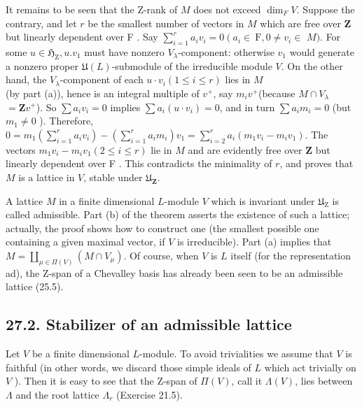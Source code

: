 \documentclass[10pt]{article}
\begin{document}
It remains to be seen that the Z-rank of $M$ does not exceed $\operatorname{dim}_{F} V$. Suppose the contrary, and let $r$ be the smallest number of vectors in $M$ which are free over $\mathbf{Z}$ but linearly dependent over F . Say $\sum_{i=1}^{r} a_{i} v_{i}=0\left(a_{i} \in \mathrm{~F}, 0 \neq v_{i} \in\right.$ $M)$. For some $u \in \mathfrak{H}_{\mathrm{Z}}, u . v_{1}$ must have nonzero $V_{\lambda}$-component: otherwise $v_{1}$ would generate a nonzero proper $\mathfrak{U}(L)$-submodule of the irreducible module $V$. On the other hand, the $V_{\lambda}$-component of each $u \cdot v_{i}(1 \leq i \leq r)$ lies in $M$\\
(by part (a)), hence is an integral multiple of $v^{+}$, say $m_{i} v^{+}$(because $M \cap V_{\lambda}$ $=\mathbf{Z} v^{+}$). So $\sum a_{i} v_{i}=0$ implies $\sum a_{i}\left(u \cdot v_{i}\right)=0$, and in turn $\sum a_{i} m_{i}=0$ (but $m_{1} \neq 0$ ). Therefore, $0=m_{1}\left(\sum_{i=1}^{r} a_{i} v_{i}\right)-\left(\sum_{i=1}^{r} a_{i} m_{i}\right) v_{1}=\sum_{i=2}^{r} a_{i}\left(m_{1} v_{i}-m_{i} v_{1}\right)$. The vectors $m_{1} v_{i}-m_{i} v_{1}(2 \leq i \leq r)$ lie in $M$ and are evidently free over $\mathbf{Z}$ but linearly dependent over F . This contradicts the minimality of $r$, and proves that $M$ is a lattice in $V$, stable under $\mathfrak{U}_{\mathbf{Z}}$.

A lattice $M$ in a finite dimensional $L$-module $V$ which is invariant under $\mathfrak{U}_{\mathrm{Z}}$ is called admissible. Part (b) of the theorem asserts the existence of such a lattice; actually, the proof shows how to construct one (the smallest possible one containing a given maximal vector, if $V$ is irreducible). Part (a) implies that $M=\coprod_{\mu \in \Pi(V)}\left(M \cap V_{\mu}\right)$. Of course, when $V$ is $L$ itself (for the representation ad), the Z-span of a Chevalley basis has already been seen to be an admissible lattice (25.5).

\subsection*{27.2. Stabilizer of an admissible lattice}
Let $V$ be a finite dimensional $L$-module. To avoid trivialities we assume that $V$ is faithful (in other words, we discard those simple ideals of $L$ which act trivially on $V$ ). Then it is easy to see that the Z-span of $\Pi(V)$, call it $\Lambda(V)$, lies between $\Lambda$ and the root lattice $\Lambda_{r}$ (Exercise 21.5).
\end{document}
